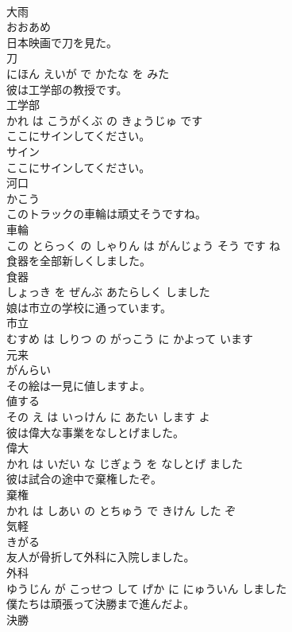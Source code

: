 \documentclass[8pt]{extreport}
\begin{document}
\begin{CJK}{UTF8}{min}
\\	大雨	
\\	おおあめ			
\\	日本映画で刀を見た。	
\\	刀 
\\	にほん えいが で かたな を みた			
\\	彼は工学部の教授です。	
\\	工学部 
\\	かれ は こうがくぶ の きょうじゅ です			
\\	ここにサインしてください。	
\\	サイン 
\\	ここにサインしてください。			
\\	河口	
\\	かこう			
\\	このトラックの車輪は頑丈そうですね。	
\\	車輪 
\\	この とらっく の しゃりん は がんじょう そう です ね			
\\	食器を全部新しくしました。	
\\	食器 
\\	しょっき を ぜんぶ あたらしく しました			
\\	娘は市立の学校に通っています。	
\\	市立 
\\	むすめ は しりつ の がっこう に かよって います			
\\	元来	
\\	がんらい			
\\	その絵は一見に値しますよ。	
\\	値する 
\\	その え は いっけん に あたい します よ			
\\	彼は偉大な事業をなしとげました。	
\\	偉大 
\\	かれ は いだい な じぎょう を なしとげ ました			
\\	彼は試合の途中で棄権したぞ。	
\\	棄権 
\\	かれ は しあい の とちゅう で きけん した ぞ			
\\	気軽	
\\	きがる			
\\	友人が骨折して外科に入院しました。	
\\	外科 
\\	ゆうじん が こっせつ して げか に にゅういん しました			
\\	僕たちは頑張って決勝まで進んだよ。	
\\	決勝 

\end{CJK}
\end{document}
